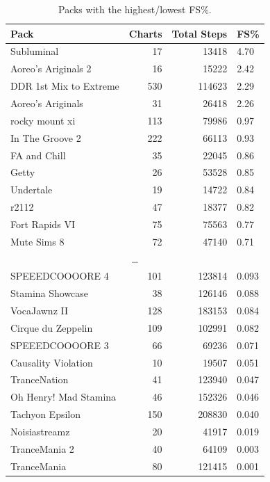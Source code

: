 \documentclass[10pt]{sigplanconf}
\begin{document}
\begin{table}[t]
	\begin{center}
		\small
	\begin{tabular}{l|r|r|l}
		\bf Pack & \bf Charts & \bf Total Steps & \bf FS\% \\
		\hline
		Subluminal               &   17 &  13418 & 4.70 \\
		Aoreo's Ariginals 2      &   16 &  15222 & 2.42 \\
		DDR 1st Mix to Extreme   &  530 & 114623 & 2.29 \\
		Aoreo's Ariginals        &   31 &  26418 & 2.26 \\
		rocky mount xi           &  113 &  79986 & 0.97 \\
		In The Groove 2          &  222 &  66113 & 0.93 \\
		FA and Chill             &   35 &  22045 & 0.86 \\
		Getty                    &   26 &  53528 & 0.85 \\
		Undertale                &   19 &  14722 & 0.84 \\
		r2112                    &   47 &  18377 & 0.82 \\
		Fort Rapids VI           &   75 &  75563 & 0.77 \\
		Mute Sims 8              &   72 &  47140 & 0.71 \\
		\multicolumn{4}{c}{\normalsize\dots} \\
		SPEEEDCOOOORE 4          &  101 & 123814 & 0.093 \\
		Stamina Showcase         &   38 & 126146 & 0.088 \\
		VocaJawnz II             &  128 & 183153 & 0.084 \\
		Cirque du Zeppelin       &  109 & 102991 & 0.082 \\
		SPEEEDCOOOORE 3          &   66 &  69236 & 0.071 \\
		Causality Violation      &   10 &  19507 & 0.051 \\
		TranceNation             &   41 & 123940 & 0.047 \\
		Oh Henry! Mad Stamina    &   46 & 152326 & 0.046 \\
		Tachyon Epsilon          &  150 & 208830 & 0.040 \\
		Noisiastreamz            &   20 &  41917 & 0.019 \\
		TranceMania 2            &   40 &  64109 & 0.003 \\
		TranceMania              &   80 & 121415 & 0.001 \\
	\end{tabular}
	\end{center}
	\caption{Packs with the highest/lowest FS\%.}
\end{table}
\end{document}
